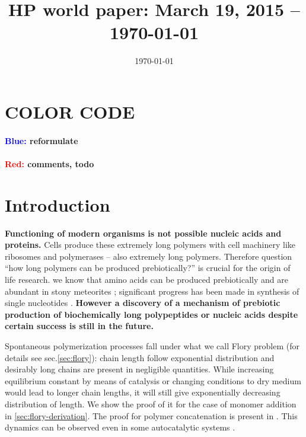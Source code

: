 \documentclass[12pt]{paper}
\title{HP world paper: March 19, 2015 -- \today}
\author{}
\date{\today}
\newcommand{\red}[1]{\textcolor{red}{#1}}
\begin{document}
 \maketitle
 \tableofcontents
 
 \section*{COLOR CODE}
\paragraph{\textcolor{blue}{Blue: } reformulate}
\paragraph{\red{Red: }comments, todo}

 
\section{Introduction} 

\textbf{Functioning of modern organisms is not possible nucleic 
acids and proteins.} Cells produce these extremely long polymers with cell machinery 
like ribosomes and polymerases -- also extremely long polymers. 
Therefore question ``how long 
polymers can be produced prebiotically?'' is crucial for the origin of life research.
we know that amino acids can be produced prebiotically \cite{Miller1953} and are abundant in 
stony meteorites \cite{Sephton2002}; significant progress has been made in synthesis of 
single nucleotides \cite{Powner2009a}. \textbf{However a discovery of a mechanism of prebiotic 
production of biochemically 
long polypeptides or nucleic acids despite certain success 
\cite{Shock1992,Martin1998,PAECHT-HOROWITZ1970,Lambert2008,Leman2004a,Orgel2004,Ferris1996} is 
still in the future.}

Spontaneous polymerization processes fall under what we call Flory problem (for details see 
sec.\ref{sec:flory}): chain length follow exponential distribution and desirably long chains are 
present in negligible quantities. While increasing equilibrium constant by means of catalysis or 
changing conditions to dry medium would lead to longer chain lengths, it will still give 
exponentially decreasing distribution of length. We show the proof of it for the case of monomer 
addition in \ref{sec:flory-derivation}. The proof for polymer concatenation is present in 
\cite{Derr2012}. This dynamics can be observed even in some autocatalytic systems \cite{Wu2009}.
\end{document}
